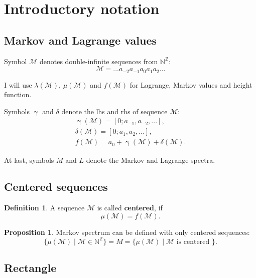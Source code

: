 \documentclass[a4paper, 12pt]{article}
\let\oldref\ref
\renewcommand{\ref}[1]{(\oldref{#1})}
\theoremstyle{definition}
\newtheorem*{definition}{Definition}
\theoremstyle{definition}
\theoremstyle{proposition}
\newtheorem*{proposition}{Proposition}
\theoremstyle{lemma}
\newcommand{\M}{\mathcal{M}}
\renewcommand{\l}{\lambda}
\newcommand{\m}{\mu}
\newcommand{\g}{\upgamma}
\renewcommand{\d}{\delta}
\begin{document}
	
\section{Introductory notation}

\subsection{Markov and Lagrange values}

Symbol $\M$ denotes double-infinite sequences from $\mathbb{N}^\mathbb{Z}$:
\begin{equation*}
	\M = ...a_{-2}a_{-1}a_0a_1a_2...
\end{equation*}

I will use $\l(\M)$, $\m(\M)$ and $f(\M)$ for Lagrange, Markov values and height function.

Symbols $\g$ and $\d$ denote the lhs and rhs of sequence $\M$:
\begin{gather*}
	\g(\M) = [0; a_{-1}, a_{-2}, ...], \\
	\d(\M) = [0; a_1, a_2, ...], \\
	f(\M) = a_0 + \g(\M) + \d(\M).
\end{gather*}

At last, symbols $M$ and $L$ denote the Markov and Lagrange spectra.


\subsection{Centered sequences}

\begin{definition}
	A sequence $\M$ is called \textbf{centered}, if
	\begin{equation}\label{centered}
		\mu(\M) = f(\M).
	\end{equation}
\end{definition}

\begin{proposition}
	Markov spectrum can be defined with only centered sequences:
	\begin{equation*}
		\{ \m(\M) \mid \M \in \mathbb{N}^\mathbb{Z} \} =
		M =
		\{ \m(\M) \mid \M \text{ is centered } \}.
	\end{equation*}
\end{proposition}



\subsection{Rectangle}
\end{document}
